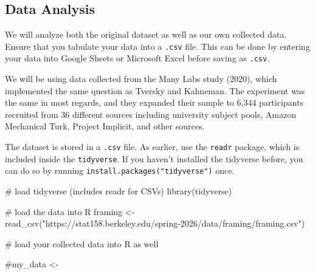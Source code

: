 \documentclass[
  letterpaper,
  DIV=11,
  numbers=noendperiod]{scrartcl}
\newenvironment{Shaded}{\begin{snugshade}}{\end{snugshade}}
\newcommand{\CommentTok}[1]{\textcolor[rgb]{0.37,0.37,0.37}{#1}}
\newcommand{\FunctionTok}[1]{\textcolor[rgb]{0.28,0.35,0.67}{#1}}
\newcommand{\NormalTok}[1]{\textcolor[rgb]{0.00,0.23,0.31}{#1}}
\newcommand{\OtherTok}[1]{\textcolor[rgb]{0.00,0.23,0.31}{#1}}
\newcommand{\StringTok}[1]{\textcolor[rgb]{0.13,0.47,0.30}{#1}}
\begin{document}
\hfill\break
\hfill\break
\hfill\break
\hfill\break
\hfill\break
\hfill\break

\subsection{Data Analysis}\label{data-analysis}

We will analyze both the original dataset as well as our own collected
data. Ensure that you tabulate your data into a \texttt{.csv} file. This
can be done by entering your data into Google Sheets or Microsoft Excel
before saving as \texttt{.csv}.

We will be using data collected from the Many Labs study (2020), which
implemented the same question as Tversky and Kahneman. The experiment
was the same in most regards, and they expanded their sample to 6,344
participants recruited from 36 different sources including university
subject pools, Amazon Mechanical Turk, Project Implicit, and other
sources.

The dataset is stored in a \texttt{.csv} file. As earlier, use the
\texttt{readr} package, which is included inside the \texttt{tidyverse}.
If you haven't installed the tidyverse before, you can do so by running
\texttt{install.packages("tidyverse")} once.

\begin{Shaded}
\begin{Highlighting}[]
\CommentTok{\# load tidyverse (includes readr for CSVs)}
\FunctionTok{library}\NormalTok{(tidyverse)}
\end{Highlighting}
\end{Shaded}

\begin{Shaded}
\begin{Highlighting}[]
\CommentTok{\# load the data into R}
\NormalTok{framing }\OtherTok{\textless{}{-}} \FunctionTok{read\_csv}\NormalTok{(}\StringTok{"https://stat158.berkeley.edu/spring{-}2026/data/framing/framing.csv"}\NormalTok{)}
\end{Highlighting}
\end{Shaded}

\begin{Shaded}
\begin{Highlighting}[]
\CommentTok{\# load your collected data into R as well}

\CommentTok{\#my\_data \textless{}{-} }
\end{Highlighting}
\end{Shaded}
\end{document}
